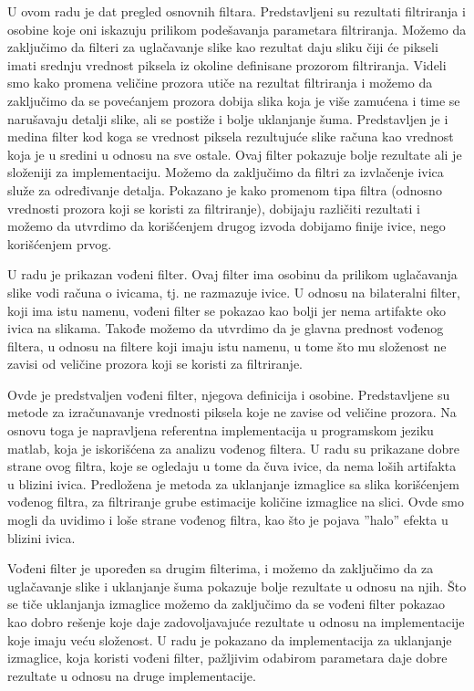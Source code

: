 \documentclass[a4paper,12pt,titlepage]{article}
\begin{document}
U ovom radu je dat pregled osnovnih filtara. Predstavljeni su rezultati filtriranja i osobine koje oni iskazuju prilikom podešavanja parametara filtriranja. Možemo da zaključimo da filteri za uglačavanje slike kao rezultat daju sliku čiji će pikseli imati srednju vrednost piksela iz okoline definisane prozorom filtriranja. Videli smo kako promena veličine prozora utiče na rezultat filtriranja i možemo da zaključimo da se povećanjem prozora dobija slika koja je više zamućena i time se narušavaju detalji slike, ali se postiže i bolje uklanjanje šuma. Predstavljen je i medina filter kod koga se vrednost piksela rezultujuće slike računa kao vrednost koja je u sredini u odnosu na sve ostale. Ovaj filter pokazuje bolje rezultate ali je složeniji za implementaciju. Možemo da zaključimo da filtri za izvlačenje ivica služe za određivanje detalja. Pokazano je kako promenom tipa filtra (odnosno vrednosti prozora koji se koristi za filtriranje), dobijaju različiti rezultati i možemo da utvrdimo da korišćenjem drugog izvoda dobijamo finije ivice, nego korišćenjem prvog.

U radu je prikazan vođeni filter. Ovaj filter ima osobinu da prilikom uglačavanja slike vodi računa o ivicama, tj. ne razmazuje ivice. U odnosu na bilateralni filter, koji ima istu namenu, vođeni filter se pokazao kao bolji jer nema artifakte oko ivica na slikama. Takođe možemo da utvrdimo da je glavna prednost vođenog filtera, u odnosu na filtere koji imaju istu namenu, u tome što mu složenost ne zavisi od veličine prozora koji se koristi za filtriranje. 

Ovde je predstvaljen vođeni filter, njegova definicija i osobine. Predstavljene su metode za izračunavanje vrednosti piksela koje ne zavise od veličine prozora. Na osnovu toga je napravljena referentna implementacija u programskom jeziku matlab, koja je iskorišćena za analizu vođenog filtera. U radu su prikazane dobre strane ovog filtra, koje se ogledaju u tome da čuva ivice, da nema loših artifakta u blizini ivica. Predložena je metoda za uklanjanje izmaglice sa slika korišćenjem vođenog filtra, za filtriranje grube estimacije količine izmaglice na slici. Ovde smo mogli da uvidimo i loše strane vođenog filtra, kao što je pojava ''halo'' efekta u blizini ivica. 

Vođeni filter je upoređen sa drugim filterima, i možemo da zaključimo da za uglačavanje slike i uklanjanje šuma pokazuje bolje rezultate u odnosu na njih. Što se tiče uklanjanja izmaglice možemo da zaključimo da se vođeni filter pokazao kao dobro rešenje koje daje zadovoljavajuće rezultate u odnosu na implementacije koje imaju veću složenost. U radu je pokazano da implementacija za uklanjanje izmaglice, koja koristi vođeni filter, pažljivim odabirom parametara daje dobre rezultate u odnosu na druge implementacije.
\end{document}
